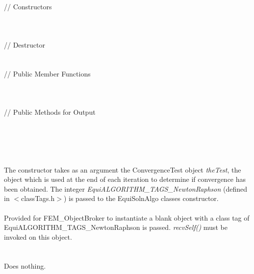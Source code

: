  \\ 
\indent // Constructors \\ 
\\ 
\\ \\
\indent // Destructor \\
\\  \\
\indent // Public Member Functions \\
 \\
 \\ \\
\indent // Public Methods  for Output \\
\\ 
\\ 
 \\

 \\ 
\\ 
The constructor takes as an argument the ConvergenceTest object {\em
theTest}, the object which is used at the end of each iteration to
determine if convergence has been obtained. The
integer {\em EquiALGORITHM\_TAGS\_NewtonRaphson} (defined in
$<$classTags.h$>$) is passed to the EquiSolnAlgo classes
constructor. \\ 

\\
Provided for FEM\_ObjectBroker to instantiate a blank object with a
class tag of EquiALGORITHM\_TAGS\_NewtonRaphson is passed. {\em
recvSelf()} must be invoked on this object. \\

 \\
\\ 
Does nothing. \\

